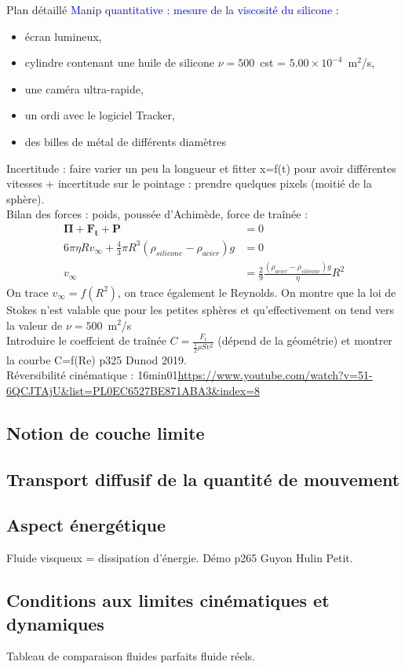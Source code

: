 \begin{reportBlock}{Plan détaillé}
\textcolor{blue}{Manip quantitative : mesure de la viscosité du silicone} :
\begin{itemize}
    \item écran lumineux,
    \item cylindre contenant une huile de silicone $\nu=500$~cst = $5.00\times10^{-4}$~m$^2$/s,
    \item une caméra ultra-rapide,
    \item un ordi avec le logiciel Tracker,
    \item des billes de métal de différents diamètres
\end{itemize}
Incertitude : faire varier un peu la longueur et fitter x=f(t) pour avoir différentes vitesses + incertitude sur le pointage : prendre quelques pixels (moitié de la sphère).\\
Bilan des forces : poids, poussée d'Achimède, force de traînée :
\begin{align*}
    \mathbf{\Pi} + \mathbf{F_t} + \mathbf{P} &= 0 \\
    6\pi\eta R v_{\infty} +\frac{4}{3}\pi R^3\left(\rho_{silicone}-\rho_{acier}\right)g &= 0 \\
    v_{\infty} &= \frac{2}{9}\frac{\left(\rho_{acier}-\rho_{silicone}\right)g}{\eta}R^2
\end{align*}
On trace $v_{\infty}=f(R^2)$, on trace également le Reynolds. On montre que la loi de Stokes n'est valable que pour les petites sphères et qu'effectivement on tend vers la valeur de $\nu=500$~m$^2$/s\\

Introduire le coeffcient de traînée $C=\frac{F_t}{\frac{1}{2}\rho Sv^2}$ (dépend de la géométrie) et montrer la courbe C=f(Re) p325 Dunod 2019.\\

Réversibilité cinématique : 16min01\url{https://www.youtube.com/watch?v=51-6QCJTAjU&list=PL0EC6527BE871ABA3&index=8}

\subsection{Notion de couche limite}
  \subsection{Transport diffusif de la quantité de mouvement}


\subsection{Aspect énergétique}
Fluide visqueux = dissipation d'énergie. Démo p265 Guyon Hulin Petit.
\subsection{Conditions aux limites cinématiques et dynamiques}
Tableau de comparaison fluides parfaits fluide réels.



\end{reportBlock}